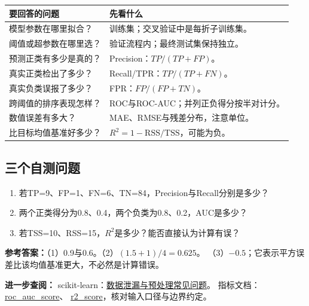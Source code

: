 \begingroup
\small
\renewcommand{\arraystretch}{1.2}
\begin{xltabular}{\textwidth}{P{38mm}Y}
\toprule
要回答的问题 & 先看什么\\
\midrule
\endhead
\bottomrule
\endfoot
模型参数在哪里拟合？ & 训练集；交叉验证中是每折子训练集。\\
阈值或超参数在哪里选？ & 验证流程内；最终测试集保持独立。\\
预测正类有多少是真的？ & Precision：$TP/(TP+FP)$。\\
真实正类检出了多少？ & Recall/TPR：$TP/(TP+FN)$。\\
真实负类误报了多少？ & FPR：$FP/(FP+TN)$。\\
跨阈值的排序表现怎样？ & ROC与ROC-AUC；并列正负得分按半对计分。\\
数值误差有多大？ & MAE、RMSE与残差分布，注意单位。\\
比目标均值基准好多少？ & $R^2=1-\mathrm{RSS}/\mathrm{TSS}$，可能为负。\\

\end{xltabular}
\endgroup

\subsection{三个自测问题}
\begin{enumerate}
\setlength{\itemsep}{1pt}\setlength{\parsep}{0pt}
 \item 若TP=9、FP=1、FN=6、TN=84，Precision与Recall分别是多少？
 \item 两个正类得分为0.8、0.4，两个负类为0.8、0.2，AUC是多少？
 \item 若TSS=10、RSS=15，$R^2$是多少？能否直接认为计算有误？
\end{enumerate}
\textbf{参考答案：}（1）0.9与0.6。（2）$(1.5+1)/4=0.625$。
（3）$-0.5$；它表示平方误差比该均值基准更大，不必然是计算错误。

\par\begingroup\small
\noindent\textbf{进一步查阅：}
scikit-learn：\href{https://scikit-learn.org/stable/common_pitfalls.html}{数据泄漏与预处理常见问题}。
指标文档：\href{https://scikit-learn.org/stable/modules/generated/sklearn.metrics.roc_auc_score.html}{roc\_auc\_score}、
 \href{https://scikit-learn.org/stable/modules/generated/sklearn.metrics.r2_score.html}{r2\_score}，核对输入口径与边界约定。
\par\endgroup
